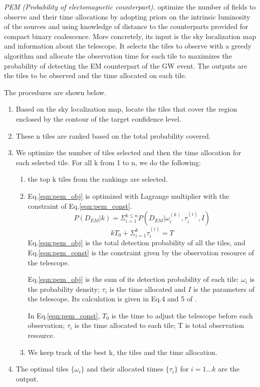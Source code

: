 \documentclass[twocolumn]{aastex61}
\begin{document}
\emph{PEM (Probability of electomagnetic counterpart).} \cite{ChHu2017} optimize the number of fields to observe and their time allocations by adopting priors on the intrinsic luminosity of the sources and using knowledge of distance to the counterparts provided for compact binary coalescence. More concretely, its input is the sky localization map and information about the telescope. It selects the tiles to observe with a greedy algorithm and allocate the observation time for each tile to maximizes the probability of detecting the EM counterpart of the GW event. The outputs are the tiles to be observed and the time allocated on each tile.

The procedures are shown below.
\begin{enumerate}
\item Based on the sky localization map, locate the tiles that cover the region enclosed by the contour of the target confidence level.
\item These n tiles are ranked based on the total probability covered.
\item We optimize the number of tiles selected and then the time allocation for each selected tile. For all k from 1 to n, we do the following:
\begin{enumerate}
\item the top k tiles from the rankings are selected. 

\item Eq.\ref{eqn:pem_obj} is optimized with Lagrange multiplier with the constraint of Eq.\ref{eqn:pem_const}. 
\begin{equation}\label{eqn:pem_obj}
P(D_{EM}|k)=\Sigma_{i=1}^{k\leq n}P(D_{EM}|\omega_i^{(k)}, \tau_i^{(i)},I)
\end{equation}
\begin{equation}\label{eqn:pem_const}
kT_0+\Sigma_{i=1}^k\tau_i^{(i)}=T
\end{equation}
Eq.\ref{eqn:pem_obj} is the total detection probability of all the tiles, and Eq.\ref{eqn:pem_const} is the constraint given by the observation resource of the telescope. 

Eq.\ref{eqn:pem_obj} is the sum of its detection probability of each tile: $\omega_i$ is the probability density; $\tau_i$ is the time allocated and $I$ is the parameters of the telescope. Its calculation is given in Eq.4 and 5 of \cite{ChHu2017}.

In Eq.\ref{eqn:pem_const}, $T_0$ is the time to adjust the telescope before each observation; $\tau_i$ is the time allocated to each tile; T is total observation resource.
\item We keep track of the best k, the tiles and the time allocation.
\end{enumerate}

\item The optimal tiles $\{\omega_i\}$ and their allocated times $\{\tau_i\}$ for $i=1...k$ are the output.
\end{enumerate}
\end{document}

